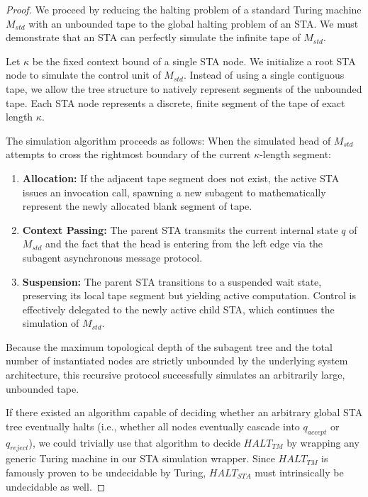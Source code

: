 \begin{proof}
We proceed by reducing the halting problem of a standard Turing machine $M_{std}$ with an unbounded tape to the global halting problem of an STA. We must demonstrate that an STA can perfectly simulate the infinite tape of $M_{std}$.

Let $\kappa$ be the fixed context bound of a single STA node. We initialize a root STA node to simulate the control unit of $M_{std}$. Instead of using a single contiguous tape, we allow the tree structure to natively represent segments of the unbounded tape.
Each STA node represents a discrete, finite segment of the tape of exact length $\kappa$. 

The simulation algorithm proceeds as follows:
When the simulated head of $M_{std}$ attempts to cross the rightmost boundary of the current $\kappa$-length segment:
\begin{enumerate}
    \item \textbf{Allocation:} If the adjacent tape segment does not exist, the active STA issues an invocation call, spawning a new subagent to mathematically represent the newly allocated blank segment of tape.
    \item \textbf{Context Passing:} The parent STA transmits the current internal state $q$ of $M_{std}$ and the fact that the head is entering from the left edge via the subagent asynchronous message protocol.
    \item \textbf{Suspension:} The parent STA transitions to a suspended wait state, preserving its local tape segment but yielding active computation. Control is effectively delegated to the newly active child STA, which continues the simulation of $M_{std}$.
\end{enumerate}

Because the maximum topological depth of the subagent tree and the total number of instantiated nodes are strictly unbounded by the underlying system architecture, this recursive protocol successfully simulates an arbitrarily large, unbounded tape. 

If there existed an algorithm capable of deciding whether an arbitrary global STA tree eventually halts (i.e., whether all nodes eventually cascade into $q_{accept}$ or $q_{reject}$), we could trivially use that algorithm to decide $HALT_{TM}$ by wrapping any generic Turing machine in our STA simulation wrapper. Since $HALT_{TM}$ is famously proven to be undecidable by Turing, $HALT_{STA}$ must intrinsically be undecidable as well.
\end{proof}

